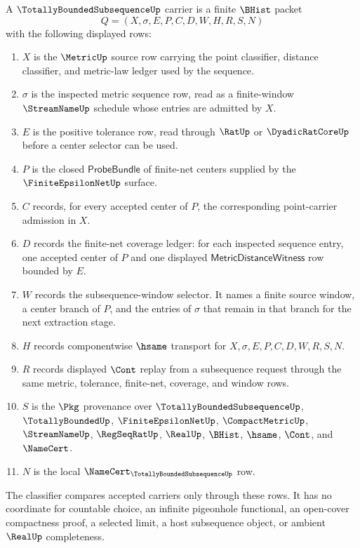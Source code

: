 \begin{definition}
\label{def:totally-bounded-subsequence-carrier}
A $\TotallyBoundedSubsequenceUp$ carrier is a finite $\BHist$ packet
$$
Q=(X,\sigma,E,P,C,D,W,H,R,S,N)
$$
with the following displayed rows:
\begin{enumerate}
\item $X$ is the $\MetricUp$ source row carrying the point classifier, distance classifier, and metric-law ledger used by the sequence.
\item $\sigma$ is the inspected metric sequence row, read as a finite-window $\StreamNameUp$ schedule whose entries are admitted by $X$.
\item $E$ is the positive tolerance row, read through $\RatUp$ or $\DyadicRatCoreUp$ before a center selector can be used.
\item $P$ is the closed $\mathsf{ProbeBundle}$ of finite-net centers supplied by the $\FiniteEpsilonNetUp$ surface.
\item $C$ records, for every accepted center of $P$, the corresponding point-carrier admission in $X$.
\item $D$ records the finite-net coverage ledger: for each inspected sequence entry, one accepted center of $P$ and one displayed $\mathsf{MetricDistanceWitness}$ row bounded by $E$.
\item $W$ records the subsequence-window selector. It names a finite source window, a center branch of $P$, and the entries of $\sigma$ that remain in that branch for the next extraction stage.
\item $H$ records componentwise $\hsame$ transport for $X,\sigma,E,P,C,D,W,R,S,N$.
\item $R$ records displayed $\Cont$ replay from a subsequence request through the same metric, tolerance, finite-net, coverage, and window rows.
\item $S$ is the $\Pkg$ provenance over $\TotallyBoundedSubsequenceUp$, $\TotallyBoundedUp$, $\FiniteEpsilonNetUp$, $\CompactMetricUp$, $\StreamNameUp$, $\RegSeqRatUp$, $\RealUp$, $\BHist$, $\hsame$, $\Cont$, and $\NameCert$.
\item $N$ is the local $\NameCert_{\TotallyBoundedSubsequenceUp}$ row.
\end{enumerate}
The classifier compares accepted carriers only through these rows. It has no coordinate for countable choice, an infinite pigeonhole functional, an open-cover compactness proof, a selected limit, a host subsequence object, or ambient $\RealUp$ completeness.
\end{definition}

